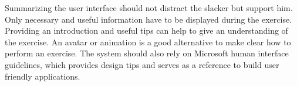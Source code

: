 Summarizing the user interface should not distract the slacker but support him. Only necessary and useful information have to be displayed during the exercise. Providing an introduction and useful tips can help to give an understanding of the exercise. An avatar or animation is a good alternative to make clear how to perform an exercise. The system should also rely on Microsoft human interface guidelines, which provides design tips and serves as a reference to build user friendly applications.
